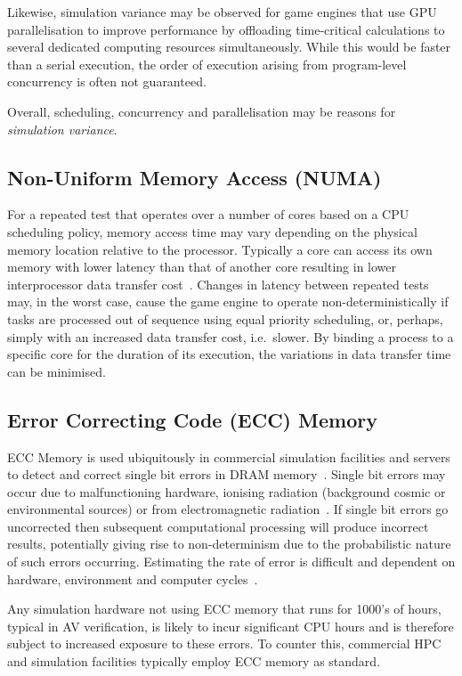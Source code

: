 Likewise, simulation variance may be observed for game engines that use GPU parallelisation to improve performance by offloading time-critical calculations to several dedicated computing resources simultaneously. While this would be faster than a serial execution, the order of execution arising from program-level concurrency is often not guaranteed. 

Overall, scheduling, concurrency and parallelisation may be reasons for \textit{simulation variance}. 

\subsection{Non-Uniform Memory Access (NUMA)} \label{s:sources_numa}
For a repeated test that operates over a number of cores based on a CPU scheduling policy, memory access time may vary depending on the physical memory location relative to the processor. Typically a core can access its own memory with lower latency than that of another core resulting in lower interprocessor data transfer cost~\cite{nieplocha1996global}. 
%
Changes in latency between repeated tests may, in the worst case, cause the game engine to operate non-deterministically if tasks are processed out of sequence using equal priority scheduling, or, perhaps, simply with an increased data transfer cost, i.e.\ slower. 
%
By binding a process to a specific core for the duration of its execution, the variations in data transfer time can be minimised.


\subsection{Error Correcting Code (ECC) Memory}
ECC Memory is used ubiquitously in commercial simulation facilities and servers to detect and correct single bit errors in DRAM memory~\cite{Dell1997}. Single bit errors may occur due to malfunctioning hardware, ionising radiation (background cosmic or environmental sources) or from electromagnetic radiation~\cite{dodd2003basic}. If single bit errors go uncorrected then subsequent computational processing will produce incorrect results, potentially giving rise to non-determinism due to the probabilistic nature of such errors occurring. Estimating the rate of error is difficult and dependent on hardware, environment and computer cycles~\cite{mielke2008bit}.

Any simulation hardware not using ECC memory that runs for 1000's of hours, typical in AV verification, is likely to incur significant CPU hours and is therefore subject to increased exposure to these errors. To counter this, commercial HPC and simulation facilities typically employ ECC memory as standard.



